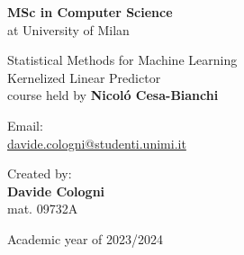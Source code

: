 \documentclass[a4paper]{article}
\begin{document}


\begin{titlepage}
    \begin{center}
        \LARGE


        \textbf{MSc in Computer Science} \\
        at University of Milan

        \vspace*{1cm}

        
        \huge
        Statistical Methods for Machine Learning\\
        Kernelized Linear Predictor\\
        
        \large course held by \textbf{Nicoló Cesa-Bianchi}
        

        \normalsize
        \vspace*{4cm}

        \begin{minipage}[t]{0.47\textwidth}
	       {Email: } \vspace{0.3em} \\
              {\large \href{davide.cologni@studenti.unimi.it}{davide.cologni@studenti.unimi.it}} \vspace{1em}  \\
        \end{minipage}
        \hfill
        \begin{minipage}[t]{0.47\textwidth}\raggedleft
	       {Created by:} \hspace{-0.9em} \vspace{0.3em} \\
              {\large \textbf{Davide Cologni}} \\
              {\footnotesize mat. 09732A}
        \end{minipage}

        \vfill
        Academic year of 2023/2024
            
    \end{center}
\end{titlepage}

\clearpage\null\newpage

\newpage
\tableofcontents
\setlength{\parindent}{0pt}
\setlength{\parskip}{0.8em}
\end{document}
